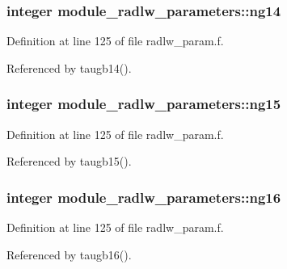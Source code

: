 \subsubsection[{\texorpdfstring{ng14}{ng14}}]{\setlength{\rightskip}{0pt plus 5cm}integer module\+\_\+radlw\+\_\+parameters\+::ng14}\hypertarget{namespacemodule__radlw__parameters_a32a603592af43d9de953c983a4e2f8c8}{}\label{namespacemodule__radlw__parameters_a32a603592af43d9de953c983a4e2f8c8}


Definition at line 125 of file radlw\+\_\+param.\+f.



Referenced by taugb14().

\subsubsection[{\texorpdfstring{ng15}{ng15}}]{\setlength{\rightskip}{0pt plus 5cm}integer module\+\_\+radlw\+\_\+parameters\+::ng15}\hypertarget{namespacemodule__radlw__parameters_a1401bb43dbe665c21a17276cd82f4859}{}\label{namespacemodule__radlw__parameters_a1401bb43dbe665c21a17276cd82f4859}


Definition at line 125 of file radlw\+\_\+param.\+f.



Referenced by taugb15().

\subsubsection[{\texorpdfstring{ng16}{ng16}}]{\setlength{\rightskip}{0pt plus 5cm}integer module\+\_\+radlw\+\_\+parameters\+::ng16}\hypertarget{namespacemodule__radlw__parameters_af6c5d2407ab29bb09fd2c297d4524e74}{}\label{namespacemodule__radlw__parameters_af6c5d2407ab29bb09fd2c297d4524e74}


Definition at line 125 of file radlw\+\_\+param.\+f.



Referenced by taugb16().

